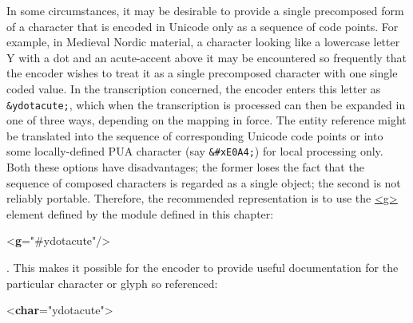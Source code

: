 In some circumstances, it may be desirable to provide a single precomposed form of a character that is encoded in Unicode only as a sequence of code points. For example, in Medieval Nordic material, a character looking like a lowercase letter Y with a dot and an acute-accent above it may be encountered so frequently that the encoder wishes to treat it as a single precomposed character with one single coded value. In the transcription concerned, the encoder enters this letter as \texttt{\&ydotacute;}, which when the transcription is processed can then be expanded in one of three ways, depending on the mapping in force. The entity reference might be translated into the sequence of corresponding Unicode code points or into some locally-defined PUA character (say \texttt{\&\#xE0A4;}) for local processing only. Both these options have disadvantages; the former loses the fact that the sequence of composed characters is regarded as a single object; the second is not reliably portable. Therefore, the recommended representation is to use the \hyperref[TEI.g]{<g>} element defined by the module defined in this chapter: \par\bgroup{}\exampleFont \begin{shaded}\noindent\mbox{}{<\textbf{g}\hspace*{1em}{ref}="{\#ydotacute}"/>}\end{shaded}\egroup\par \noindent . This makes it possible for the encoder to provide useful documentation for the particular character or glyph so referenced: \par\bgroup{}\exampleFont \begin{shaded}\noindent\mbox{}{<\textbf{char}\hspace*{1em}{xml:id}="{ydotacute}">}\mbox{}\newline 
{}\mbox{}\newline 

\end{shaded}
